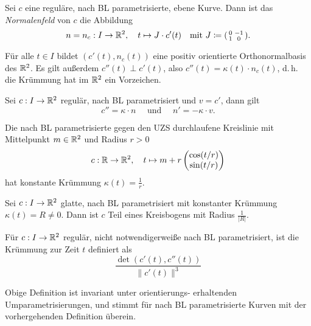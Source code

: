 \documentclass{cheat-sheet}
\begin{document}
\begin{definition}
  Sei $c$ eine reguläre, nach BL parametrisierte, ebene Kurve. Dann ist das \emph{Normalenfeld} von $c$ die Abbildung
  \[ n = n_c : I \to \mathbb{R}^2, \quad t \mapsto J \cdot c'(t) \quad \text{mit } J \coloneqq (\begin{smallmatrix} 0 & -1 \\ 1 & 0 \end{smallmatrix}).  \]
  
\end{definition}

\begin{bem}
  Für alle $t \in I$ bildet $(c'(t), n_c(t))$ eine positiv orientierte Orthonormalbasis des $\mathbb{R}^2$.
  Es gilt außerdem $c''(t) \perp c'(t)$, also $c''(t) = \kappa(t) \cdot n_c(t)$, d.\,h. die Krümmung hat im $\mathbb{R}^2$ ein Vorzeichen.
\end{bem}

\begin{satz}
  Sei $c : I \to \mathbb{R}^2$ regulär, nach BL parametrisiert und $v = c'$, dann gilt
  \[ c'' = \kappa \cdot n \quad \text{ und } \quad n' = -\kappa \cdot v. \]
\end{satz}


\begin{bsp}
  Die nach BL parametrisierte gegen den UZS durchlaufene Kreislinie mit Mittelpunkt $m \in \mathbb{R}^2$ und Radius $r > 0$
  \[ c : \mathbb{R} \to \mathbb{R}^2, \quad t \mapsto m + r \begin{pmatrix} \cos(t/r) \\ \sin(t/r) \end{pmatrix} \]
  hat konstante Krümmung $\kappa(t) = \tfrac{1}{r}$.
\end{bsp}

\begin{satz}
  Sei $c : I \to \mathbb{R}^2$ glatte, nach BL parametrisiert mit konstanter Krümmung $\kappa(t) = R \not= 0$. Dann ist $c$ Teil eines Kreisbogens mit Radius $\tfrac{1}{|R|}$.
\end{satz}

\begin{definition}
  Für $c : I \to \mathbb{R}^2$ regulär, nicht notwendigerweiße nach BL parametrisiert, ist die Krümmung zur Zeit $t$ definiert als
  \[ \frac{\det(c'(t), c''(t))}{ \| c'(t) \|^3 } \]
\end{definition}

\begin{bem}
  Obige Definition ist invariant unter orientierungs- erhaltenden Umparametrisierungen, und stimmt für nach BL parametrisierte Kurven mit der vorhergehenden Definition überein.
\end{bem}
\end{document}
